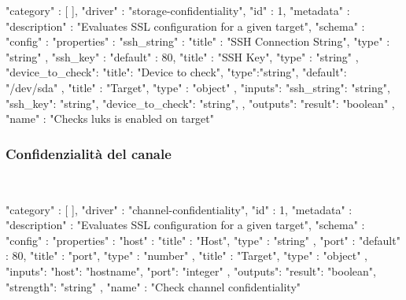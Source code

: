 \documentclass[../main.tex]{subfiles}
\begin{document}
\begin{js}
{
  "category" : [  ],
  "driver" : "storage-confidentiality",
  "id" : 1,
  "metadata" : {
      "description" : "Evaluates SSL configuration for a given target",
      "schema" : { "config" : {
              "properties" : {
                  "ssh_string" : {
                      "title" : "SSH Connection String",
                      "type" : "string"
                    },
                  "ssh_key" : {
                      "default" : 80,
                      "title" : "SSH Key",
                      "type" : "string"
                    },
                    "device_to_check": {
                        "title": "Device to check",
                        "type":"string",
                        "default": "/dev/sda"
                    }
                },
              "title" : "Target",
              "type" : "object"
            }
        },
        "inputs": {
            "ssh_string": "string",
            "ssh_key": "string",
            "device_to_check": "string",
        },
        "outputs": {
            "result": "boolean"
        }
    },
  "name" : "Checks luks is enabled on target"
}
\end{js}

\subsubsection{Confidenzialità del canale}
\\

\begin{js}
{
  "category" : [  ],
  "driver" : "channel-confidentiality",
  "id" : 1,
  "metadata" : {
      "description" : "Evaluates SSL configuration for a given target",
      "schema" : { "config" : {
              "properties" : {
                  "host" : {
                      "title" : "Host",
                      "type" : "string"
                    },
                  "port" : {
                      "default" : 80,
                      "title" : "port",
                      "type" : "number"
                    }
                },
              "title" : "Target",
              "type" : "object"
            }
        },
        "inputs": {
            "host": "hostname",
            "port": "integer"
        },
        "outputs": {
            "result": "boolean",
            "strength": "string"
        }
    },
  "name" : "Check channel confidentiality"
}
\end{js}
\end{document}
